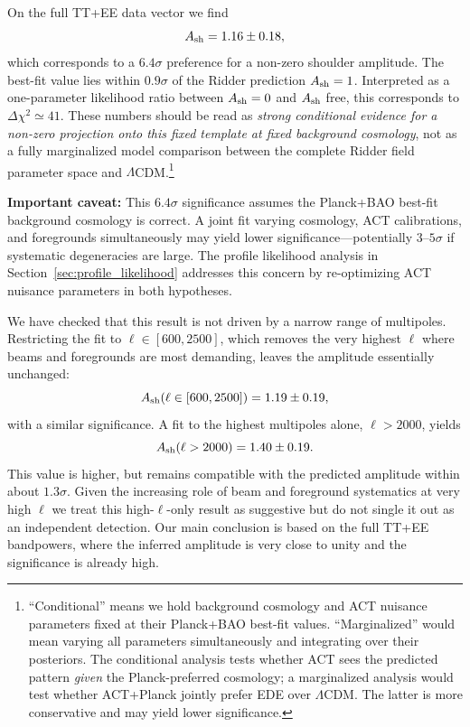 \documentclass[a4paper,11pt]{article}
\begin{document}
On the full TT+EE data vector we find
\begin{equation}
A_{\rm sh} = 1.16 \pm 0.18,
\end{equation}
which corresponds to a $6.4\sigma$ preference for a non-zero shoulder amplitude. The best-fit value lies within $0.9\sigma$ of the Ridder prediction $A_{\rm sh}=1$. Interpreted as a one-parameter likelihood ratio between $A_{\rm sh}=0$ and $A_{\rm sh}$ free, this corresponds to $\Delta\chi^2 \simeq 41$. These numbers should be read as \emph{strong conditional evidence for a non-zero projection onto this fixed template at fixed background cosmology}, not as a fully marginalized model comparison between the complete Ridder field parameter space and $\Lambda$CDM.\footnote{``Conditional'' means we hold background cosmology and ACT nuisance parameters fixed at their Planck+BAO best-fit values. ``Marginalized'' would mean varying all parameters simultaneously and integrating over their posteriors. The conditional analysis tests whether ACT sees the predicted pattern \emph{given} the Planck-preferred cosmology; a marginalized analysis would test whether ACT+Planck jointly prefer EDE over $\Lambda$CDM. The latter is more conservative and may yield lower significance.}

\textbf{Important caveat:} This $6.4\sigma$ significance assumes the Planck+BAO best-fit background cosmology is correct. A joint fit varying cosmology, ACT calibrations, and foregrounds simultaneously may yield lower significance---potentially $3$--$5\sigma$ if systematic degeneracies are large. The profile likelihood analysis in Section~\ref{sec:profile_likelihood} addresses this concern by re-optimizing ACT nuisance parameters in both hypotheses.

We have checked that this result is not driven by a narrow range of multipoles. Restricting the fit to $\ell \in [600,2500]$, which removes the very highest $\ell$ where beams and foregrounds are most demanding, leaves the amplitude essentially unchanged:
\begin{equation}
A_{\rm sh}(\ell\in[600,2500]) = 1.19 \pm 0.19,
\end{equation}
with a similar significance. A fit to the highest multipoles alone, $\ell > 2000$, yields
\begin{equation}
A_{\rm sh}(\ell>2000) = 1.40 \pm 0.19.
\end{equation}
This value is higher, but remains compatible with the predicted amplitude within about $1.3\sigma$. Given the increasing role of beam and foreground systematics at very high $\ell$ we treat this high-$\ell$-only result as suggestive but do not single it out as an independent detection. Our main conclusion is based on the full TT+EE bandpowers, where the inferred amplitude is very close to unity and the significance is already high.
\end{document}
